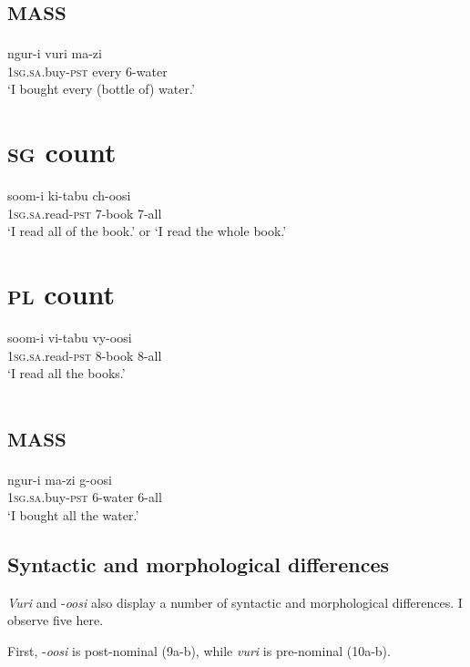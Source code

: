 \documentclass[output=paper]{langsci/langscibook}
\begin{document}
\chapter[mass]{\textsc{mass}}
\gll ngur-i      vuri    ma-zi    \\
     1\textsc{sg.sa}.buy-\textsc{pst}    every    6-water\\
\glt ‘I bought every (bottle of) water.’
\z

\chapter[  ]{\textit{  }}
\chapter[sg count]{\textsc{sg} count}
\gll soom-i      ki-tabu  ch-oosi    \\
     1\textsc{sg.sa}.read-\textsc{pst}  7-book  7-all\\
\glt ‘I read all of the book.’ or ‘I read the whole book.’
\z

\chapter[pl count]{\textsc{pl} count}
\gll soom-i      vi-tabu  vy-oosi  \\
     1\textsc{sg.sa}.read-\textsc{pst}  8-book  8-all\\
\glt ‘I read all the books.’
\z

\chapter[mass]{\textsc{mass}}
\gll ngur-i      ma-zi    g-oosi  \\
     1\textsc{sg.sa}.buy-\textsc{pst}    6-water  6-all\\
\glt ‘I bought all the water.’
\z

\section{Syntactic and morphological differences}

\textit{Vuri }and -\textit{oosi} also display a number of syntactic and morphological differences. I observe five here.

  First, -\textit{oosi} is post-nominal (9a-b), while \textit{vuri} is pre-nominal (10a-b). 

\chapter{}
\end{document}
